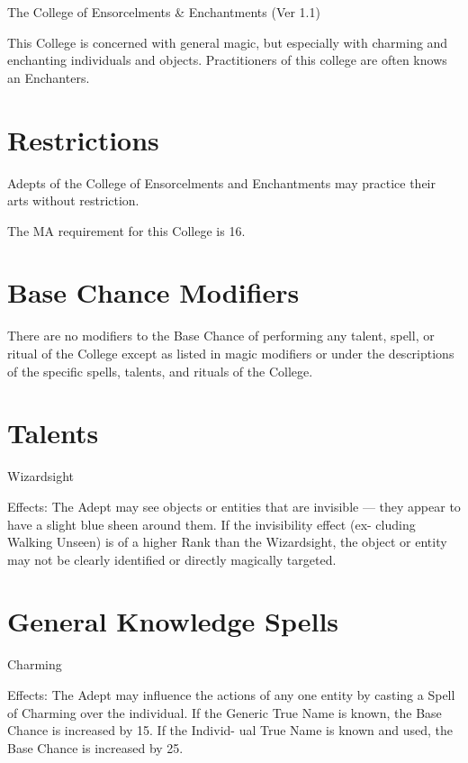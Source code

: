 \begin{Chapter}{The College of Ensorcelments \& Enchantments (Ver 1.1)}

This College is concerned with general magic, but especially with
charming and enchanting individuals and objects.  Practitioners of
this college are often knows an Enchanters.


\section{Restrictions}

Adepts of the College of Ensorcelments and Enchantments may practice
their arts without restriction.

The MA requirement for this College is 16. 


\section{Base Chance Modifiers}

There are no modifiers to the Base Chance of performing any talent,
spell, or ritual of the College except as listed in magic modifiers or
under the descriptions of the specific spells, talents, and rituals of
the College.


\section{Talents}

\begin{talent}[T-1]{Wizardsight }

Effects: The Adept may see objects or entities that 
are  invisible  —  they  appear  to  have  a  slight  blue 
sheen  around  them.  If  the  invisibility  effect  (ex-
cluding Walking Unseen) is of a higher Rank than 
the  Wizardsight,  the  object  or  entity  may  not  be 
clearly identified or directly magically targeted. 
\end{talent}

\section{General Knowledge Spells}

\begin{spell}[G-1]{Charming }

Effects:  The  Adept  may  influence  the  actions  of 
any one entity by casting a Spell of Charming over 
the individual. If the Generic True Name is known, 
the Base Chance is increased by 15. If the Individ-
ual  True  Name  is  known  and  used,  the  Base 
Chance is increased by 25. 


\end{spell}
\end{Chapter}
